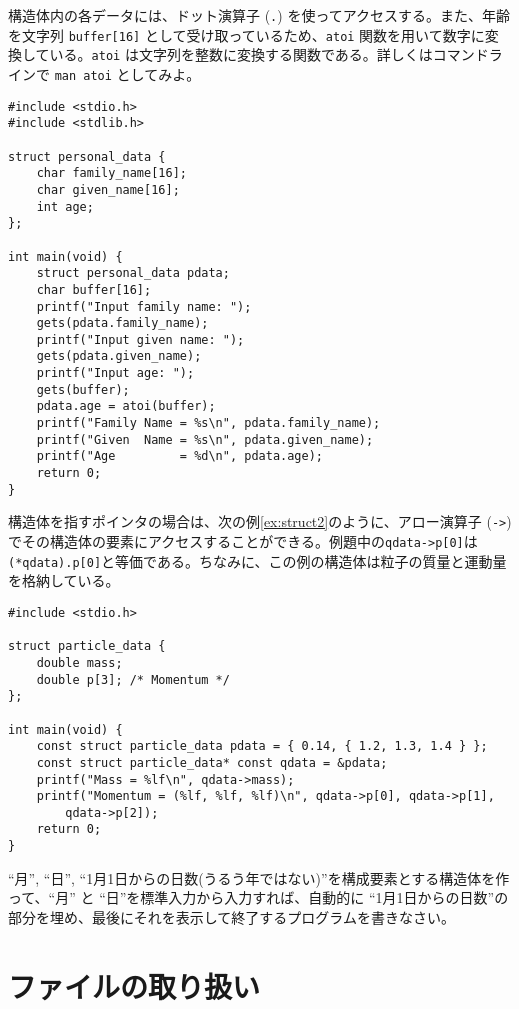 構造体内の各データには、ドット演算子 (\texttt{.}) を使ってアクセスする。また、年齢を文字列 \texttt{buffer[16]} として受け取っているため、\texttt{atoi} 関数を用いて数字に変換している。\texttt{atoi} は文字列を整数に変換する関数である。詳しくはコマンドラインで \texttt{man atoi} としてみよ。
\begin{reidai}\label{ex:struct1}
    \begin{verbatim}
#include <stdio.h>
#include <stdlib.h>

struct personal_data {
    char family_name[16];
    char given_name[16];
    int age;
};

int main(void) {
    struct personal_data pdata;
    char buffer[16];
    printf("Input family name: ");
    gets(pdata.family_name);
    printf("Input given name: ");
    gets(pdata.given_name);
    printf("Input age: ");
    gets(buffer);
    pdata.age = atoi(buffer);
    printf("Family Name = %s\n", pdata.family_name);
    printf("Given  Name = %s\n", pdata.given_name);
    printf("Age         = %d\n", pdata.age);
    return 0;
}
\end{verbatim}
\end{reidai} \noindent
構造体を指すポインタの場合は、次の例\ref{ex:struct2}のように、アロー演算子 (\texttt{->}) でその構造体の要素にアクセスすることができる。例題中の\texttt{qdata->p[0]}は\texttt{(*qdata).p[0]}と等価である。ちなみに、この例の構造体は粒子の質量と運動量を格納している。
\begin{reidai}\label{ex:struct2}
    \begin{verbatim}
#include <stdio.h>

struct particle_data {
    double mass;
    double p[3]; /* Momentum */
};

int main(void) {
    const struct particle_data pdata = { 0.14, { 1.2, 1.3, 1.4 } };
    const struct particle_data* const qdata = &pdata;
    printf("Mass = %lf\n", qdata->mass);
    printf("Momentum = (%lf, %lf, %lf)\n", qdata->p[0], qdata->p[1],
        qdata->p[2]);
    return 0;
}
\end{verbatim}
\end{reidai}

\begin{renshuu}\label{prob:7-1}
    ``月'', ``日'', ``1月1日からの日数(うるう年ではない)''を構成要素とする構造体を作って、``月'' と ``日''を標準入力から入力すれば、自動的に ``1月1日からの日数''の部分を埋め、最後にそれを表示して終了するプログラムを書きなさい。
\end{renshuu}

\section{ファイルの取り扱い}

